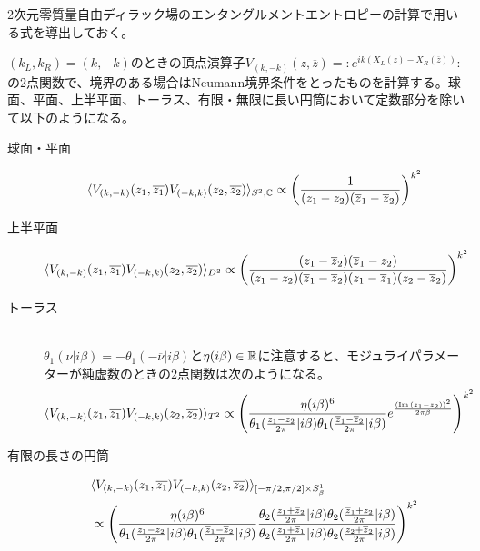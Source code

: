 \begin{ex}
2次元零質量自由ディラック場のエンタングルメントエントロピーの計算で用いる式を導出しておく。

$(k_L,k_R)=(k,-k)$のときの頂点演算子$V_{(k,-k)}(z,\overline{z})=\colon e^{ik (X_L(z)- X_R(\overline{z}))}\colon $の2点関数で、境界のある場合はNeumann境界条件をとったものを計算する。球面、平面、上半平面、トーラス、有限・無限に長い円筒において定数部分を除いて以下のようになる。
\begin{oframed}
\begin{description}
	\item[球面・平面]
	\begin{align}
	\langle V_{(k,-k)}(z_1,\overline{z_1}) V_{(-k,k)}(z_2,\overline{z_2}) \rangle_{S^2,\mathbb{C}} \propto \left(\frac{1}{(z_1-z_2)(\overline{z}_1-\overline{z}_2)}\right)^{k^2}
	\end{align}
	
	\item[上半平面]
	\begin{align}
	\langle V_{(k,-k)}(z_1,\overline{z_1}) V_{(-k,k)}(z_2,\overline{z_2}) \rangle_{D^2} \propto \left(\frac{(z_1-\overline{z}_2)(\overline{z}_1-z_2)}{(z_1-z_2)(\overline{z}_1-\overline{z}_2)(z_1-\overline{z}_1)(z_2-\overline{z}_2)}\right)^{k^2}
	\end{align}
	
	\item[トーラス] \hfill\\
	$\overline{\theta_1(\nu|i\beta)}=-\theta_1(-\overline{\nu}|i\beta)$と$\eta(i\beta)\in\mathbb{R}$に注意すると、モジュライパラメーターが純虚数のときの$2$点関数は次のようになる。
	\begin{align}
	\langle V_{(k,-k)}(z_1,\overline{z_1}) V_{(-k,k)}(z_2,\overline{z_2}) \rangle_{T^2} \propto \left(\frac{\eta(i\beta)^6}{\theta_1(\frac{z_1-z_2}{2\pi}|i\beta)\theta_1(\frac{\overline{z}_1-\overline{z}_2}{2\pi}|i\beta)}e^{\frac{(\text{Im}\,(z_1-z_2) )^2}{2\pi\beta}}\right)^{k^2}
	\end{align}
	
	\item[有限の長さの円筒]
	\begin{align}
	&\langle V_{(k,-k)}(z_1,\overline{z_1}) V_{(-k,k)}(z_2,\overline{z_2}) \rangle_{[-\pi/2,\pi/2]\times S_\beta^1}\notag\\
	&\propto \left(\frac{\eta(i\beta)^6}{\theta_1(\frac{z_1-z_2}{2\pi}|i\beta)\theta_1(\frac{\overline{z}_1-\overline{z}_2}{2\pi}|i\beta)}
	\frac{\theta_2(\frac{z_1+\overline{z}_2}{2\pi}|i\beta)\theta_2(\frac{\overline{z}_1+z_2}{2\pi}|i\beta)}{\theta_2(\frac{z_1+\overline{z}_1}{2\pi}|i\beta)\theta_2(\frac{z_2+\overline{z}_2}{2\pi}|i\beta)}\right)^{k^2}\label{fincylvertex2ptfunc}
	\end{align}
	

\end{description}
\end{oframed}
\end{ex}
